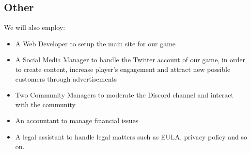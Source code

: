 ﻿\subsection{Other}

We will also employ:

\begin{itemize}
	\item A Web Developer to setup the main site for our game
	\item A Social Media Manager to handle the Twitter account of our game, in order to create content, increase player's engagement and attract new possible customers through advertisements
	\item Two Community Managers to moderate the Discord channel and interact with the community 
	\item An accountant to manage financial issues
	\item A legal assistant to handle legal matters such as EULA, privacy policy and so on.
\end{itemize}

